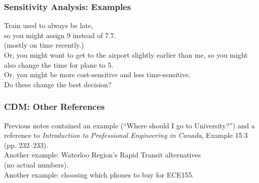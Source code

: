 \begin{frame}
\frametitle{Sensitivity Analysis: Examples}

\begin{changemargin}{1.5cm}
Train used to always be late, \\ so you might assign 9
instead of 7.7. \\ \qquad (mostly on time recently.) \\[1em]

Or, you
might want to get to the airport slightly earlier than me, so you might also
change the time for plane to 5.\\[1em]

Or, you might be more cost-sensitive and less time-sensitive.\\[1em]

Do these change the best decision?
\end{changemargin}
\end{frame}

\begin{frame}
\frametitle{CDM: Other References}

\begin{changemargin}{1em}
Previous notes contained an example (``Where should I go to
University?'') and a reference to \emph{Introduction to
  Professional Engineering in Canada}, Example 15.3
(pp. 232--233). \\[1em]

Another example: Waterloo Region's
Rapid Transit alternatives \\ \qquad (no actual numbers). \\[1em]

Another example: choosing which phones to buy for ECE155.
\end{changemargin}
\end{frame}


